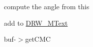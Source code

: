 
\begin{DoxyRefList}
\item[\label{todo__todo000001}%
\hypertarget{todo__todo000001}{}%
Member \hyperlink{class_d_r_w___m_text_a907a02526a50cef1f93487dbf8b929b8}{D\+R\+W\+\_\+\+M\+Text\+:\+:parse\+Dwg} (D\+R\+W\+::\+Version version, dwg\+Buffer $\ast$buf)]compute the angle from this 



add to \hyperlink{class_d_r_w___m_text}{D\+R\+W\+\_\+\+M\+Text} 

buf-\/$>$get\+C\+M\+C 
\end{DoxyRefList}